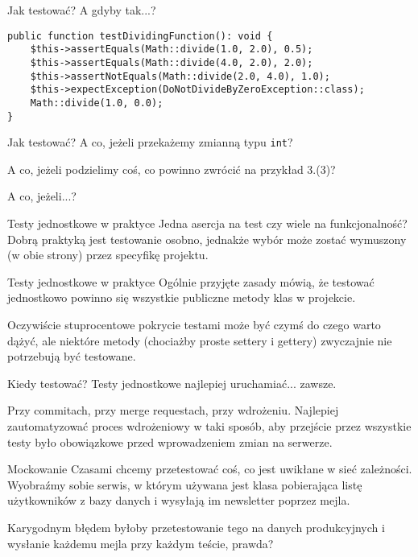 \begin{frame}[fragile]{Jak testować?}
	A gdyby tak...?
	
\begin{lstlisting}
public function testDividingFunction(): void {
    $this->assertEquals(Math::divide(1.0, 2.0), 0.5);
    $this->assertEquals(Math::divide(4.0, 2.0), 2.0);
    $this->assertNotEquals(Math::divide(2.0, 4.0), 1.0);
    $this->expectException(DoNotDivideByZeroException::class);
    Math::divide(1.0, 0.0);
}
\end{lstlisting}
\end{frame}

\begin{frame}[fragile]{Jak testować?}
	A co, jeżeli przekażemy zmianną typu \texttt{int}?
	
	A co, jeżeli podzielimy coś, co powinno zwrócić na przykład 3.(3)?
	
	A co, jeżeli...?
\end{frame}

\begin{frame}{Testy jednostkowe w praktyce}
	Jedna asercja na test czy wiele na funkcjonalność? Dobrą praktyką jest testowanie osobno, jednakże wybór może zostać wymuszony (w obie strony) przez specyfikę projektu.
\end{frame}

\begin{frame}{Testy jednostkowe w praktyce}
	Ogólnie przyjęte zasady mówią, że testować jednostkowo powinno się wszystkie publiczne metody klas w projekcie.
	
	Oczywiście stuprocentowe pokrycie testami może być czymś do czego warto dążyć, ale niektóre metody (chociażby proste settery i gettery) zwyczajnie nie potrzebują być testowane.
\end{frame}

\begin{frame}{Kiedy testować?}
	Testy jednostkowe najlepiej uruchamiać... zawsze. 
	
	Przy commitach, przy merge requestach, przy wdrożeniu. Najlepiej zautomatyzować proces wdrożeniowy w taki sposób, aby przejście przez wszystkie testy było obowiązkowe przed wprowadzeniem zmian na serwerze.
\end{frame}

\begin{frame}{Mockowanie}
	Czasami chcemy przetestować coś, co jest uwikłane w sieć zależności. Wyobraźmy sobie serwis, w którym używana jest klasa pobierająca listę użytkowników z bazy danych i wysyłają im newsletter poprzez mejla.
	
	Karygodnym błędem byłoby przetestowanie tego na danych produkcyjnych i wysłanie każdemu mejla przy każdym teście, prawda?
\end{frame}

